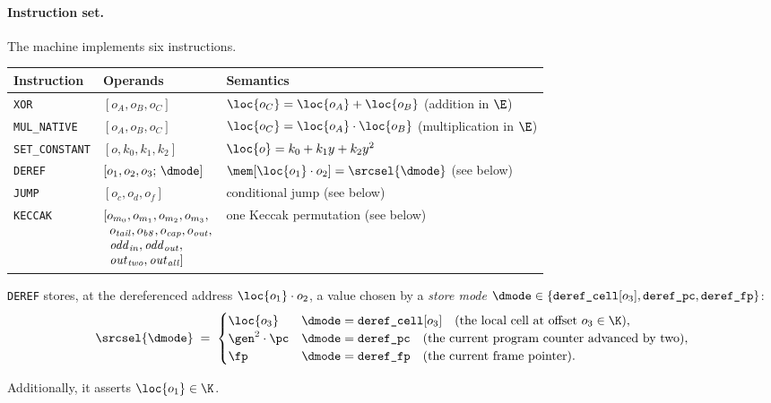\paragraph{Instruction set.} The machine implements six instructions.
\begin{center}
\begin{tabularx}{\textwidth}{@{}llX@{}}
\hline
Instruction & Operands & Semantics\\
\hline
\texttt{XOR}           & $[o_A,o_B,o_C]$ & $\loc{o_C}=\loc{o_A}+\loc{o_B}$ (addition in $\E$)\\
\texttt{MUL\_NATIVE}   & $[o_A,o_B,o_C]$ & $\loc{o_C}=\loc{o_A}\cdot\loc{o_B}$ (multiplication in $\E$)\\
\texttt{SET\_CONSTANT} & $[o,k_0,k_1,k_2]$ & $\loc{o}=k_0+k_1y+k_2y^{2}$\\
\texttt{DEREF}         & $[o_1,o_2,o_3;\,\dmode]$ & $\mem[\loc{o_1}\cdot o_2]=\srcsel{\dmode}$ (see below)\\
\texttt{JUMP}          & $[o_c,o_d,o_f]$ & conditional jump (see below)\\
\texttt{KECCAK}           & $\begin{array}[t]{@{}l@{}}[o_{m_0},o_{m_1},o_{m_2},o_{m_3},\\ \;\:o_{\mathit{tail}},o_{\mathit{b8}},o_{\mathit{cap}},o_{\mathit{out}},\\ \;\:\mathit{odd}_{\mathit{in}},\mathit{odd}_{\mathit{out}},\\ \;\:\mathit{out}_{\mathit{two}},\mathit{out}_{\mathit{all}}]\end{array}$ & one Keccak permutation (see below)\\
\hline
\end{tabularx}
\end{center}


\texttt{DEREF} stores, at the dereferenced address $\loc{o_1}\cdot o_2$, a value chosen by a \emph{store mode} $\dmode\in\{\texttt{deref\_cell}[o_3],\texttt{deref\_pc},\texttt{deref\_fp}\}$:
\[
  \srcsel{\dmode}\;=\;
  \begin{cases}
    \loc{o_3} & \dmode=\texttt{deref\_cell}[o_3] \quad(\text{the local cell at offset }o_3 \in \K),\\
    \gen^{2}\cdot\pc & \dmode=\texttt{deref\_pc} \quad(\text{the current program counter advanced by two}),\\
    \fp & \dmode=\texttt{deref\_fp} \quad(\text{the current frame pointer}).
  \end{cases}
\]

Additionally, it asserts $\loc{o_1} \in \K$.

